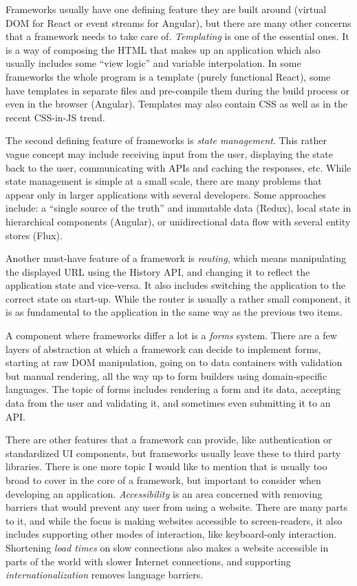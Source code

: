 \documentclass[english,odsaz]{fitthesis}
\begin{document}
Frameworks usually have one defining feature they are built around (virtual DOM
for React or event streams for Angular), but there are many other concerns that
a framework needs to take care of. \emph{Templating} is one of the essential ones. It
is a way of composing the HTML that makes up an application which also usually
includes some ``view logic'' and variable interpolation. In some frameworks the
whole program is a template (purely functional React), some have templates in
separate files and pre-compile them during the build process or even in the
browser (Angular). Templates may also contain CSS as well as in the recent
CSS-in-JS trend.

The second defining feature of frameworks is \emph{state management}. This rather vague
concept may include receiving input from the user, displaying the state back to
the user, communicating with APIs and caching the responses, etc. While state
management is simple at a small scale, there are many problems that appear only
in larger applications with several developers. Some approaches include: a
``single source of the truth'' and immutable data (Redux), local state in
hierarchical components (Angular), or unidirectional data flow with several
entity stores (Flux).

Another must-have feature of a framework is \emph{routing}, which means manipulating
the displayed URL using the History API, and changing it to reflect the
application state and vice-versa. It also includes switching the application to
the correct state on start-up. While the router is usually a rather small
component, it is as fundamental to the application in the same way as the previous two
items.

A component where frameworks differ a lot is a \emph{forms} system. There are a few
layers of abstraction at which a framework can decide to implement forms,
starting at raw DOM manipulation, going on to data containers with validation
but manual rendering, all the way up to form builders using domain-specific
languages. The topic of forms includes rendering a form and its data,
accepting data from the user and validating it, and sometimes even submitting it
to an API.

There are other features that a framework can provide, like authentication or
standardized UI components, but frameworks usually leave these to third party
libraries. There is one more topic I would like to mention that is usually too
broad to cover in the core of a framework, but important to consider when
developing an application. \emph{Accessibility} is an area concerned with removing
barriers that would prevent any user from using a website. There are many parts
to it, and while the focus is making websites accessible to screen-readers, it
also includes supporting other modes of interaction, like keyboard-only
interaction. Shortening \emph{load times} on slow connections also makes a website
accessible in parts of the world with slower Internet connections, and
supporting \emph{internationalization} removes language barriers.
\end{document}
